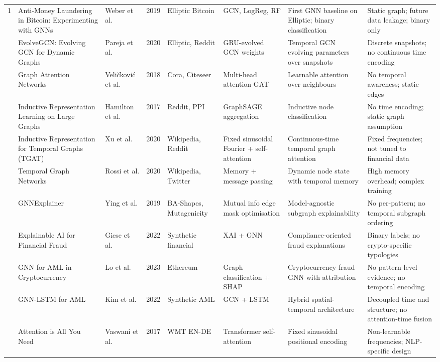 \begin{longtable}{@{} c p{2.7cm} p{1.7cm} c p{1.3cm} p{1.5cm} p{2.1cm} p{2.1cm} @{}}
1 & Anti-Money Laundering in Bitcoin: Experimenting with GNNs & Weber et al. & 2019 & Elliptic Bitcoin & GCN, LogReg, RF & First GNN baseline on Elliptic; binary classification & Static graph; future data leakage; binary only \\
\addlinespace
2 & EvolveGCN: Evolving GCN for Dynamic Graphs & Pareja et al. & 2020 & Elliptic, Reddit & GRU-evolved GCN weights & Temporal GCN evolving parameters over snapshots & Discrete snapshots; no continuous time encoding \\
\addlinespace
3 & Graph Attention Networks & Veli\v{c}kovi\'{c} et al. & 2018 & Cora, Citeseer & Multi-head attention GAT & Learnable attention over neighbours & No temporal awareness; static edges \\
\addlinespace
4 & Inductive Representation Learning on Large Graphs & Hamilton et al. & 2017 & Reddit, PPI & GraphSAGE aggregation & Inductive node classification & No time encoding; static graph assumption \\
\addlinespace
5 & Inductive Representation for Temporal Graphs (TGAT) & Xu et al. & 2020 & Wikipedia, Reddit & Fixed sinusoidal Fourier + self-attention & Continuous-time temporal graph attention & Fixed frequencies; not tuned to financial data \\
\addlinespace
6 & Temporal Graph Networks & Rossi et al. & 2020 & Wikipedia, Twitter & Memory + message passing & Dynamic node state with temporal memory & High memory overhead; complex training \\
\addlinespace
7 & GNNExplainer & Ying et al. & 2019 & BA-Shapes, Mutagenicity & Mutual info edge mask optimisation & Model-agnostic subgraph explainability & No per-pattern; no temporal subgraph ordering \\
\addlinespace
8 & Explainable AI for Financial Fraud & Giese et al. & 2022 & Synthetic financial & XAI + GNN & Compliance-oriented fraud explanations & Binary labels; no crypto-specific typologies \\
\addlinespace
9 & GNN for AML in Cryptocurrency & Lo et al. & 2023 & Ethereum & Graph classification + SHAP & Cryptocurrency fraud GNN with attribution & No pattern-level evidence; no temporal encoding \\
\addlinespace
10 & GNN-LSTM for AML & Kim et al. & 2022 & Synthetic AML & GCN + LSTM & Hybrid spatial-temporal architecture & Decoupled time and structure; no attention-time fusion \\
\addlinespace
11 & Attention is All You Need & Vaswani et al. & 2017 & WMT EN-DE & Transformer self-attention & Fixed sinusoidal positional encoding & Non-learnable frequencies; NLP-specific design \\

\end{longtable}
